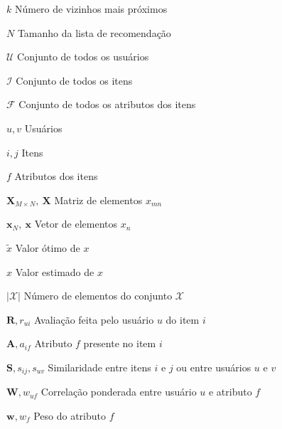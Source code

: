 \begin{simbolos}\label{simbolos}
    \item[$k$]  Número de vizinhos mais próximos 
    \item[$N$] Tamanho da lista de recomendação  
    \item[$\mathcal{U}$] Conjunto de todos os usuários 
    \item[$\mathcal{I}$] Conjunto de todos os itens  
    \item[$\mathcal{F}$] Conjunto  de todos os atributos dos itens
    \item[$u, v$] Usuários 
    \item[$i, j$] Itens 
    \item[$f$] Atributos dos itens 
    \item[$\mathbf{X}_{M \times N},~\mathbf{X}$] Matriz de elementos $x_{mn}$ 
    \item[$\mathbf{x}_{N},~\mathbf{x}$] Vetor de elementos $x_{n}$
    \item[$\tilde{x}$] Valor ótimo de $x$
    \item[$\hat{x}$] Valor estimado de $x$
    \item[$|\mathcal{X}|$] Número de elementos do conjunto $\mathcal{X}$
    \item[$\mathbf{R}, r_{ui}$] Avaliação feita pelo usuário $u$ do item $i$
    \item[$\mathbf{A}, a_{if}$] Atributo $f$ presente no item $i$
    \item[$\mathbf{S}, s_{ij}, s_{uv}$] Similaridade entre itens $i$ e $j$ ou entre usuários $u$ e $v$
    \item[$\mathbf{W}, w_{uf}$] Correlação ponderada entre usuário $u$ e atributo $f$ 
    \item[$\mathbf{w}, w_{f}$] Peso do atributo $f$
\end{simbolos}
